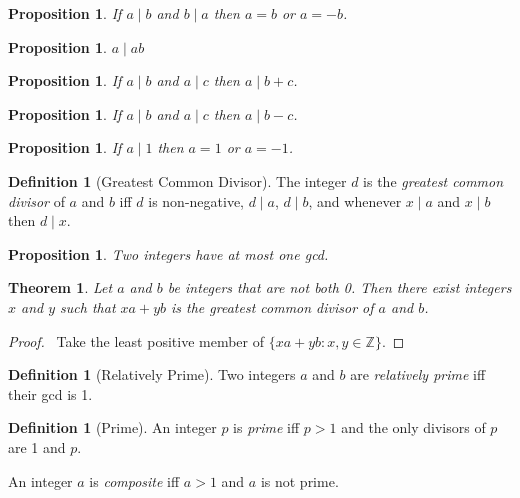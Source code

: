 \documentclass{article}
\let\qed\relax
\newtheorem{proposition}[axiom]{Proposition}
\newtheorem{theorem}[axiom]{Theorem}
\theoremstyle{definition}
\newtheorem{definition}[axiom]{Definition}
\begin{document}
    \begin{proposition}
        If $a \mid b$ and $b \mid a$ then $a = b$ or $a = -b$.
    \end{proposition}

    \begin{proposition}
        $a \mid ab$
    \end{proposition}

    \begin{proposition}
        If $a \mid b$ and $a \mid c$ then $a \mid b + c$.
    \end{proposition}

    \begin{proposition}
        If $a \mid b$ and $a \mid c$ then $a \mid b - c$.
    \end{proposition}
    
    \begin{proposition}
        If $a \mid 1$ then $a = 1$ or $a = -1$.
    \end{proposition}

    \begin{definition}[Greatest Common Divisor]
        The integer $d$ is the \emph{greatest common divisor} of $a$ and $b$ iff $d$ is non-negative,
        $d \mid a$, $d \mid b$,
        and whenever $x \mid a$ and $x \mid b$ then $d \mid x$.
    \end{definition}

    \begin{proposition}
        Two integers have at most one gcd.
    \end{proposition}

    \begin{theorem}
        Let $a$ and $b$ be integers that are not both 0. Then there exist integers $x$ and $y$ such that
        $xa + yb$ is the greatest common divisor of $a$ and $b$.
    \end{theorem}

    \begin{proof}
        \pf\ Take the least positive member of $\{ xa + yb : x,y \in \mathbb{Z} \}$. \qed
    \end{proof}

    \begin{definition}[Relatively Prime]
        Two integers $a$ and $b$ are \emph{relatively prime} iff their gcd is 1.
    \end{definition}

    \begin{definition}[Prime]
        An integer $p$ is \emph{prime} iff $p > 1$ and the only divisors of $p$ are 1 and $p$.
        
        An integer $a$ is \emph{composite} iff $a > 1$ and $a$ is not prime.
    \end{definition}
\end{document}
